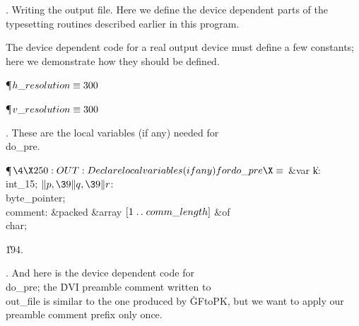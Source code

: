 .  Writing the output file.
Here we define the device dependent parts of the typesetting routines
described earlier in this program.

The device dependent code for a real output device must define a few constants;
here we demonstrate how they should be defined.

\Y\P\D {}$\\{h\_resolution}\S300$\par
\P\D {}$\\{v\_resolution}\S300$\par
\fi

. These are the local variables (if any) needed for \\{do\_pre}.

\Y\P$\4\X250:OUT: Declare local variables (if any) for \\{do\_pre}\X\S$\6
\4\&{var} \|k: \\{int\_15};\6
$\|p,\39\|q,\39\|r$: \\{byte\_pointer};\6
\\{comment}: \&{packed} \&{array} $[1\to\\{comm\_length}]$ \1\&{of}\5
\\{char};\2\par
\U194.\fi

. And here is the device dependent code for \\{do\_pre}; the \.{DVI}
preamble
comment written to \\{out\_file} is similar to the one produced by \.{GFtoPK},
but we want to apply our preamble comment prefix only once.

